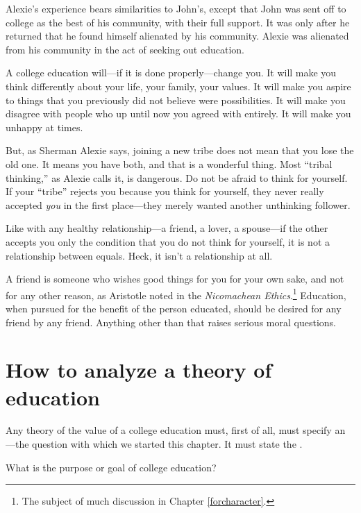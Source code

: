 Alexie's experience bears similarities to John's, except that John was sent off to college as the best of his community, with their full support. It was only after he returned that he found himself alienated by his community. Alexie was alienated from his community in the act of seeking out education. 

A college education will---if it is done properly---change you. It will make you think differently about your life, your family, your values. It will make you aspire to things that you previously did not believe were possibilities. It will make you disagree with people who up until now you agreed with entirely. It will make you unhappy at times.

But, as Sherman Alexie says, joining a new tribe does not mean that you lose the old one. It means you have both, and that is a wonderful thing. Most ``tribal thinking,'' as Alexie calls it, is dangerous. Do not be afraid to think for yourself. If your ``tribe'' rejects you because you think for yourself, they never really accepted \emph{you} in the first place---they merely wanted another unthinking follower. 

Like with any healthy relationship---a friend, a lover, a spouse---if the other accepts you only the condition that you do not think for yourself, it is not a relationship between equals. Heck, it isn't a relationship at all. 

A friend is someone who wishes good things for you for your own sake, and not for any other reason, as Aristotle noted in the \emph{Nicomachean Ethics}.\footnote{The subject of much discussion in Chapter \ref{forcharacter}.} Education, when pursued for the benefit of the person educated, should be desired for any friend by any friend. Anything other than that raises serious moral questions.

\section{How to analyze a theory of education}
\label{howtoanalyzeatheoryofeducation}

Any theory of the value of a college education must, first of all, must specify an ---the question with which we started this chapter. It must state the . 
\begin{purpose} \label{purpose:educationalpurpose} What is the purpose or goal of college education?\end{purpose}


